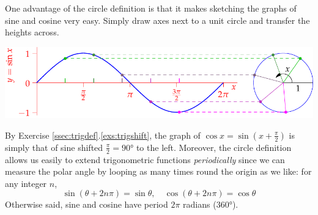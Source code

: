 One advantage of the circle definition is that it makes sketching the graphs of sine and cosine very easy. Simply draw axes next to a unit circle and transfer the heights across.
\begin{center}
	\includegraphics{invsine4}
\end{center}
By Exercise \ref*{ssec:trigdef}.\ref{exs:trigshift}, the graph of $\cos x=\sin(x+\frac\pi 2)$ is simply that of sine shifted $\frac\pi 2=\ang{90}$ to the left. Moreover, the circle definition allows us easily to extend trigonometric functions \emph{periodically} since we can measure the polar angle by looping as many times round the origin as we like: for any integer $n$,
\[
	\sin(\theta+2n\pi)=\sin\theta,\quad 
	\cos(\theta+2n\pi)=\cos\theta
\]
Otherwise said, sine and cosine have period $2\pi$ radians ($\ang{360}$).\medbreak



